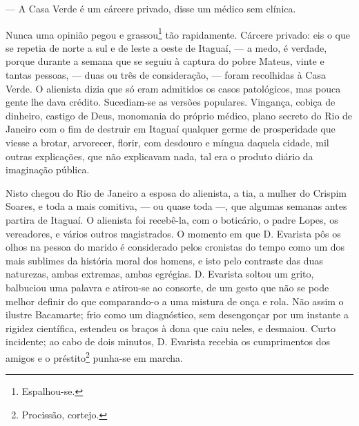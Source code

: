 --- A Casa Verde é um cárcere privado, disse um médico sem clínica.

Nunca uma opinião pegou e grassou\footnote{Espalhou-se.} tão
rapidamente. Cárcere privado: eis o que se repetia de norte a sul e de
leste a oeste de Itaguaí, --- a medo, é verdade, porque durante a semana
que se seguiu à captura do pobre Mateus, vinte e tantas pessoas, ---
duas ou três de consideração, --- foram recolhidas à Casa Verde. O
alienista dizia que só eram admitidos os casos patológicos, mas pouca
gente lhe dava crédito. Sucediam-se as versões populares. Vingança,
cobiça de dinheiro, castigo de Deus, monomania do próprio médico, plano
secreto do Rio de Janeiro com o fim de destruir em Itaguaí qualquer
germe de prosperidade que viesse a brotar, arvorecer, florir, com
desdouro e míngua daquela cidade, mil outras explicações, que não
explicavam nada, tal era o produto diário da imaginação pública.

Nisto chegou do Rio de Janeiro a esposa do alienista, a tia, a mulher do
Crispim Soares, e toda a mais comitiva, --- ou quase toda ---, que
algumas semanas antes partira de Itaguaí. O alienista foi recebê-la, com
o boticário, o padre Lopes, os vereadores, e vários outros magistrados.
O momento em que D. Evarista pôs os olhos na pessoa do marido é
considerado pelos cronistas do tempo como um dos mais sublimes da
história moral dos homens, e isto pelo contraste das duas naturezas,
ambas extremas, ambas egrégias. D. Evarista soltou um grito, balbuciou
uma palavra e atirou-se ao consorte, de um gesto que não se pode melhor
definir do que comparando-o a uma mistura de onça e rola. Não assim o
ilustre Bacamarte; frio como um diagnóstico, sem desengonçar por um
instante a rigidez científica, estendeu os braços à dona que caiu neles,
e desmaiou. Curto incidente; ao cabo de dois minutos, D. Evarista
recebia os cumprimentos dos amigos e o préstito\footnote{Procissão,
  cortejo.} punha-se em marcha.

